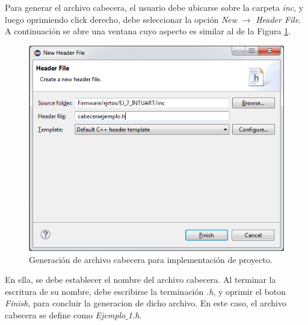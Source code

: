 \documentclass[12pt,letterpaper]{article}
\begin{document}
\begin{enumerate}
 
Para generar el archivo cabecera, el usuario debe ubicarse sobre la carpeta \textit{inc}, y luego oprimiendo click derecho, debe seleccionar la opción \textit{New} $\rightarrow$ \textit{Header File}. A continuación se abre una ventana cuyo aspecto es similar al de la Figura \ref{archivocabecerasapi1}.
\begin{figure}[H]
\centering
\includegraphics[width=8 cm]{figuras/f27.png}
\caption{Generación de archivo cabecera para implementación de proyecto.}
\label{archivocabecerasapi1}
\end{figure}
En ella, se debe establecer el nombre del archivo cabecera. Al terminar la escritura de su nombre, debe escribirse la terminación \textit{.h}, y oprimir el boton \textit{Finish}, para concluir la generacion de dicho archivo.
En este caso, el archivo cabecera se define como \textit{Ejemplo$\_$1.h}.


\end{enumerate}
\end{document}

